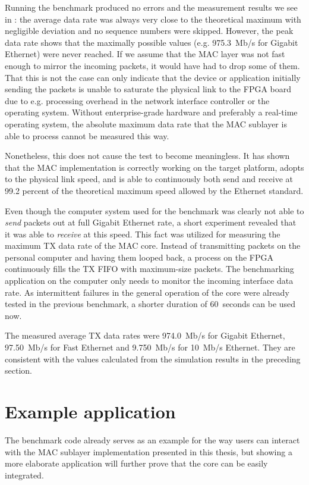 \documentclass[a4paper, 11pt, oneside]{Thesis}  %
\begin{document}
Running the benchmark produced no errors and the measurement results we see in : the average data rate was always very close to the theoretical maximum with negligible deviation and no sequence numbers were skipped. However, the peak data rate shows that the maximally possible values (e.g. 975.3~Mb/s for Gigabit Ethernet) were never reached. If we assume that the MAC layer was not fast enough to mirror the incoming packets, it would have had to drop some of them. That this is not the case can only indicate that the device or application initially sending the packets is unable to saturate the physical link to the FPGA board due to e.g. processing overhead in the network interface controller or the operating system. Without enterprise-grade hardware and preferably a real-time operating system, the absolute maximum data rate that the MAC sublayer is able to process cannot be measured this way.

Nonetheless, this does not cause the test to become meaningless. It has shown that the MAC implementation is correctly working on the target platform, adopts to the physical link speed, and is able to continuously both send and receive at 99.2 percent of the theoretical maximum speed allowed by the Ethernet standard.

Even though the computer system used for the benchmark was clearly not able to \emph{send} packets out at full Gigabit Ethernet rate, a short experiment revealed that it was able to \emph{receive} at this speed. This fact was utilized for measuring the maximum TX data rate of the MAC core. Instead of transmitting packets on the personal computer and having them looped back, a process on the FPGA continuously fills the TX FIFO with maximum-size packets. The benchmarking application on the computer only needs to monitor the incoming interface data rate. As intermittent failures in the general operation of the core were already tested in the previous benchmark, a shorter duration of 60~seconds can be used now.

The measured average TX data rates were 974.0~Mb/s for Gigabit Ethernet, 97.50~Mb/s for Fast Ethernet and 9.750~Mb/s for 10~Mb/s Ethernet. They are consistent with the values calculated from the simulation results in the preceding section.

\section{Example application}

The benchmark code already serves as an example for the way users can interact with the MAC sublayer implementation presented in this thesis, but showing a more elaborate application will further prove that the core can be easily integrated.
\end{document}
